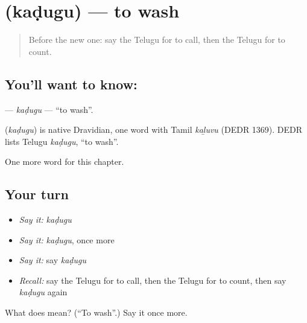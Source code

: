 \section[\texorpdfstring{\te{కడుగు} (kaḍugu)}{కడుగు (kaḍugu)}]{ (kaḍugu) — to wash}

\label{lesson:TE-C146-kadugu}



\begin{quote}
Before the new one: say the Telugu for to call, then the Telugu for to count.
\end{quote}

\subsection*{You'll want to know: }
\textbf{} — \emph{kaḍugu} — \textquotedblleft{}to wash\textquotedblright{}.

\begin{cousinweb}
\textbf{} (\emph{kaḍugu}) is native Dravidian, one word with Tamil \emph{kaḻuvu} (DEDR 1369). DEDR lists Telugu \emph{kaḍugu}, \textquotedblleft{}to wash\textquotedblright{}.
\end{cousinweb}

\begin{grammarlens}[title={What you've built}]
One more word for this chapter.
\end{grammarlens}

\subsection*{Your turn}
\begin{itemize}
\raggedright
  \item \emph{Say it:} \emph{kaḍugu}
  \item \emph{Say it:} \emph{kaḍugu}, once more
  \item \emph{Say it:} say \emph{kaḍugu}
  \item \emph{Recall:} say the Telugu for to call, then the Telugu for to count, then say \emph{kaḍugu} again
\end{itemize}

\begin{tcolorbox}[breakable,colback=teal!4,colframe=teal!35!black,title={Before you move on}]
What does  mean? (\textquotedblleft{}To wash\textquotedblright{}.) Say it once more.
\end{tcolorbox}
